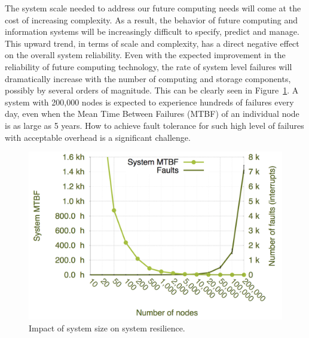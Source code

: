 
The system scale needed to address our future computing needs will come at the cost of increasing complexity. As a result, the behavior of future computing and information systems will be increasingly difficult to specify, predict and manage.
This upward trend, in terms of scale and complexity, has a direct negative effect on the overall system reliability. 
Even with the expected improvement in the reliability of future computing technology, the rate of system level failures will dramatically increase with the number of computing and storage components, possibly by several orders of magnitude. This can be clearly seen in Figure~\ref{fig:exe_failure}. A system with 200,000 nodes is expected to experience hundreds of failures every day, even when the Mean Time Between Failures (MTBF) of an individual node is as large as 5 years. How to achieve fault tolerance for such high level of failures with acceptable overhead is a significant challenge. 

\begin{figure}[!t]
	\begin{center}
		\includegraphics[width=0.7\columnwidth]{Figures/sandia_system_failure_rate_increase_nodes}
	\end{center}
	\caption{Impact of system size on system resilience.}
	\label{fig:exe_failure}
\end{figure}

